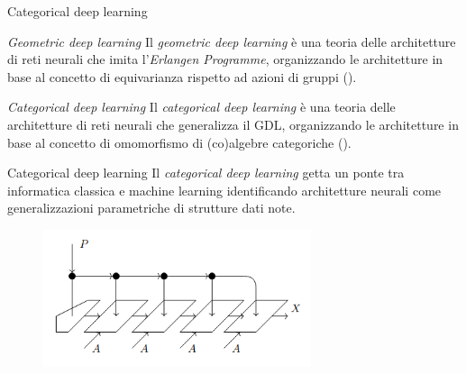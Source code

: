 \documentclass{beamer}
\begin{document}
\begin{frame}{Categorical deep learning}
    \begin{block}{\textit{Geometric deep learning}}
        Il \textit{geometric deep learning} è una teoria delle architetture di reti neurali che imita l'\textit{Erlangen Programme}, organizzando le architetture in base al concetto di equivarianza rispetto ad azioni di gruppi (\cite{bronstein2021geometric}).
    \end{block}

    \begin{block}{\textit{Categorical deep learning}}
        Il \textit{categorical deep learning} è una teoria delle architetture di reti neurali che generalizza il GDL, organizzando le architetture in base al concetto di omomorfismo di (co)algebre categoriche (\cite{gavranovicposition}).
    \end{block}
\end{frame}

\begin{frame}{Categorical deep learning}
    Il \textit{categorical deep learning} getta un ponte tra informatica classica e machine learning identificando architetture neurali come generalizzazioni parametriche di strutture dati note.

    \begin{figure}
        \begin{center}
            \includegraphics[width=0.7\textwidth]{figures/folding_rnn.png}
            \caption*{\cite{gavranovicposition}}
        \end{center}
    \end{figure}
\end{frame}
\end{document}
